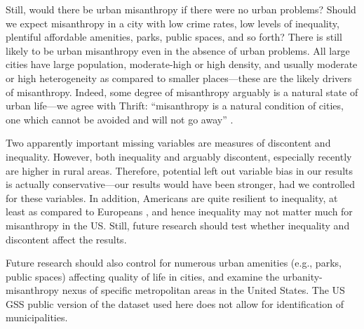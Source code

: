 \documentclass[11pt, letterpaper]{article}
\begin{document}
\begin{spacing}{1.4}
Still, would there be urban misanthropy if there were no urban problems? Should
we expect misanthropy in a city with low crime rates, low levels of inequality,
plentiful affordable amenities, parks, public spaces, and so forth? There is
still likely to be urban misanthropy even in the absence of urban problems.  
All large cities have large population, moderate-high or high
density, and usually moderate or high heterogeneity as compared to smaller
places---these are the likely drivers of misanthropy. Indeed, some degree of
misanthropy arguably is a natural state of urban life---we agree with Thrift: ``misanthropy is a natural
condition of cities, one which cannot be avoided and will not go away'' \citep{thrift05}.
%


Two apparently important missing variables are measures of discontent and
inequality. However, both inequality \citep[e.g.,][]{daleyMISCNYT20apr14} %
and arguably discontent, especially recently 
\citep[e.g.,][]{case15,hansonCityJournalautumn15,fullerNYT17monD} 
%
 are higher in rural areas. Therefore, potential left out variable bias in our results is
actually conservative---our results would have been stronger, had we controlled
for these variables. In addition, Americans are  quite
  resilient to inequality, at least as compared to Europeans
  \citep{alesina04al}, and hence inequality may not matter much for
  misanthropy in the US.
Still, future research should test whether inequality and discontent affect the
results. 

Future research should also control for numerous urban amenities (e.g., parks,
public spaces) affecting quality of life in cities, and examine the
urbanity-misanthropy nexus of specific metropolitan areas in the United
States. The US GSS public version of the dataset used here does not allow for
identification of municipalities.


\end{spacing}
\end{document}
